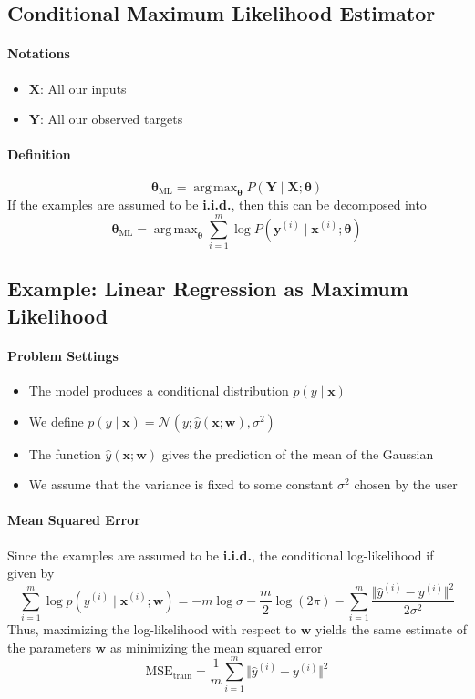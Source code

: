 \documentclass[12pt, a4paper]{article}
\def\vx{\boldsymbol{x}}
\def\vX{\boldsymbol{X}}
\def\vY{\boldsymbol{Y}}
\def\vw{\boldsymbol{w}}
\def\vtheta{\boldsymbol{\theta}}
\DeclareMathOperator*{\argmax}{arg\,max}
\newcommand{\egvx}[1]{\boldsymbol{x}^{(#1)}}
\newcommand{\egvy}[1]{\boldsymbol{y}^{(#1)}}
\newcommand{\egy}[1]{y^{(#1)}}
\newcommand{\eghy}[1]{\hat{y}^{(#1)}}
\newcommand{\condiP}[3]{P(#1 \mid #2;#3)}
\newcommand{\condip}[3]{p(#1 \mid #2;#3)}
\newcommand{\ND}[3]{\mathcal{N}(#1;#2,#3)}
\begin{document}
\subsection{Conditional Maximum Likelihood Estimator}
\paragraph{Notations}
\begin{itemize}
    \item $\vX$: All our inputs
    \item $\vY$: All our observed targets
\end{itemize}
\paragraph{Definition}
\[
    \vtheta_{\text{ML}} = \argmax_{\vtheta} \condiP{\vY}{\vX}{\vtheta}
\]
If the examples are assumed to be \textbf{i.i.d.}, then this can be decomposed into
\[
    \vtheta_{\text{ML}} = \argmax_{\vtheta} \sum_{i=1}^m \log \condiP{\egvy{i}}{\egvx{i}}{\vtheta}
\]

\subsection{Example: Linear Regression as Maximum Likelihood}
\paragraph{Problem Settings}
\begin{itemize}
    \item The model produces a conditional distribution $p(y \mid \vx)$
    \item We define $p(y \mid \vx) = \ND{y}{\hat{y}(\vx; \vw)}{\sigma^2}$
    \item The function $\hat{y}(\vx; \vw)$ gives the prediction of the mean of the Gaussian
    \item We assume that the variance is fixed to some constant $\sigma^2$ chosen by the user
\end{itemize}
\paragraph{Mean Squared Error}
Since the examples are assumed to be \textbf{i.i.d.}, the conditional log-likelihood if given by
\[
    \sum_{i=1}^m \log \condip{\egy{i}}{\egvx{i}}{\vw} = 
    - m \log \sigma - \frac{m}{2} \log (2\pi) - \sum_{i=1}^m \frac{\Vert \eghy{i} - \egy{i} \Vert^2}{2\sigma^2}
\]
Thus, maximizing the log-likelihood with respect to $\vw$ yields the same estimate of the parameters $\vw$ as minimizing the mean squared error 
\[
    \mathrm{MSE}_\text{train} = \frac{1}{m} \sum_{i=1}^m \Vert \eghy{i} - \egy{i} \Vert^2
\]
\end{document}
